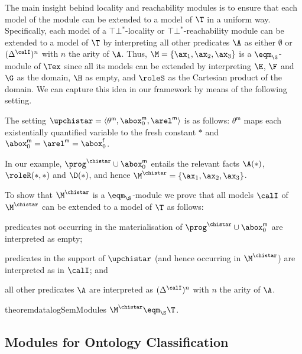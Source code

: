 %
The main insight behind locality and reachability
modules
is to ensure that each model of the module can be extended
to a model of $\T$ in a uniform way. 
Specifically,
each model of a $\top\!\bot\!^*$-locality or
$\top\!\bot\!^*$-reachability module can be
extended to a model of $\T$ by interpreting all other
predicates $\A$ as either $\emptyset$ or
$(\Delta^{\calI})^{n}$ with $n$ the arity of $\A$.
Thus, $\M = \{\ax_1,\ax_2,\ax_3\}$ is
a $\eqm_{\S}$-module of $\Tex$ since all its models
can be extended
by interpreting $\E$, $\F$ and $\G$ as
the domain, $\H$ as empty, and $\roleS$ as the Cartesian 
product of the domain.
We can capture this idea in our framework by means of the following setting.
%
\begin{definition} \label{def:chistar}
  The setting $\upchistar=\langle \theta^{\mathsf{m}}, \abox_0^{\mathsf{m}}, \arel^{\mathsf{m}} \rangle$ is
  as follows:
  $\theta^{\mathsf{m}}$ maps  each existentially quantified variable  to the fresh constant
  $\ast$ and
  $\abox_0^\mathsf{m} = \arel^\mathsf{m} = \abox_0^{\mathsf{f}}$. %
\end{definition}
%
In our example, 
$\prog^{\chistar}\cup\abox_0^{\mathsf{m}}$ entails the
relevant facts
$\A(\ast)$, $\roleR(\ast,\ast)$ and $\D(\ast)$, and hence  
$\M^{\chistar} = \{\ax_1,\ax_2,\ax_3\}$.

To show that $\M^{\chistar}$
is a $\eqm_{\S}$-module we prove that
all models $\calI$ of $\M^{\chistar}$
can be extended to a model of $\T$
as follows:
% 
\begin{inparaenum}[\it(i)]
\item predicates not occurring in the materialisation
of $\prog^{\chistar} \cup \abox_0^{\mathsf{m}}$ are interpreted as empty;
\item predicates in the support
of $\upchistar$ (and hence occurring in $\M^{\chistar}$)
are interpreted as in $\calI$; and
\item all other predicates $\A$ are interpreted as $(\Delta^{\calI})^{n}$ with $n$ the arity of $\A$. 
\end{inparaenum}
%
\begin{restatable}{theorem}{datalogSemModules} \label{thm:datalogSemModules}
  $\M^{\chistar}\eqm_{\S}\T$. 
\end{restatable}



\subsection{Modules for Ontology Classification}\label{sec:modules-class}

